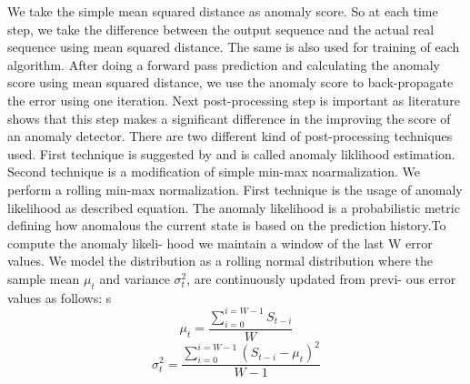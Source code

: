 \documentclass[12pt]{article}
\begin{document}
We take the simple mean squared distance as anomaly score. So at each time step, we take the difference between the output sequence and the actual real sequence using mean squared distance. The same is also used for training of each algorithm. After doing a forward pass prediction and calculating the anomaly score using mean squared distance, we use the anomaly score to back-propagate the error using one iteration.
Next post-processing step is important as literature shows that this step makes a significant difference in the improving the score of an anomaly detector. There are two different kind of post-processing techniques used. First technique is suggested by \cite{ahmad2017unsupervised} and is called anomaly liklihood estimation. Second technique is a modification of simple min-max noarmalization. We perform a rolling min-max normalization.
First technique is the usage of anomaly likelihood as described equation.
The anomaly likelihood is a probabilistic metric defining how anomalous the current state is based on the prediction history.To compute the anomaly likeli-
hood we maintain a window of the last W error values. We model
the distribution as a rolling normal distribution where the sample
mean $\mu_t$ and variance $\sigma^2_t$, are continuously updated from previ-
ous error values as follows:
s\begin{equation}
\mu_t = \frac{\sum_{i=0}^{i=W-1} S_{t-i}}{W}
\end{equation}
\begin{equation}
\sigma^2_t=\frac{\sum_{i=0}^{i=W-1} (S_{t-i}-\mu_t)^2}{W-1}
\end{equation}
\end{document}
